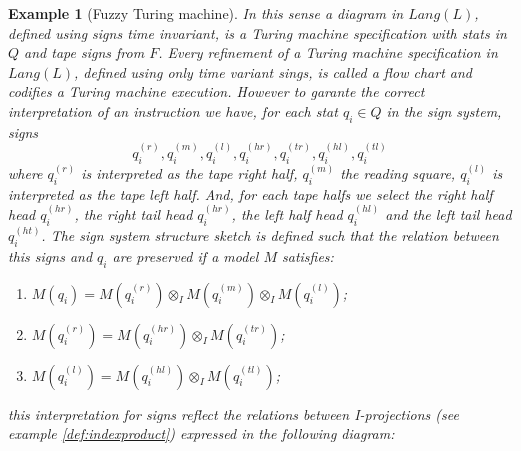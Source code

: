 \documentclass[oribibl]{llncs}
\newtheorem{exam}{Example}
\begin{document}
\begin{exam}[Fuzzy Turing machine]
 In this sense a diagram in $Lang(L)$, defined using signs time invariant, is a \emph{Turing machine specification} with stats in $Q$ and tape signs from $F$.  Every refinement of a Turing machine specification in $Lang(L)$, defined using only time variant sings, is called a \emph{flow chart} and codifies a Turing machine execution. However to garante the correct interpretation of an instruction we have, for each stat $q_i\in Q$ in the sign system,  signs \[q_i^{(r)},q_i^{(m)},q_i^{(l)},q_i^{(hr)},q_i^{(tr)},q_i^{(hl)},q_i^{(tl)}\]
 where $q_i^{(r)}$ is interpreted as the tape right half, $q_i^{(m)}$ the reading square, $q_i^{(l)}$ is interpreted as the tape left half. And, for each tape halfs we select the right half head $q_i^{(hr)}$, the right tail head $q_i^{(hr)}$, the left half head $q_i^{(hl)}$ and the left tail head $q_i^{(ht)}$. The sign system structure sketch is defined such that the relation between this signs and $q_i$ are preserved if a model $M$ satisfies:
 \begin{enumerate}
   \item $M(q_i)=M(q_i^{(r)})\otimes_I M(q_i^{(m)})\otimes_I M(q_i^{(l)})$;
   \item $M(q_i^{(r)})=M(q_i^{(hr)})\otimes_I M(q_i^{(tr)})$;
   \item $M(q_i^{(l)})=M(q_i^{(hl)})\otimes_I M(q_i^{(tl)})$;
 \end{enumerate}
this interpretation for signs reflect the relations between I-projections (see example  \ref{def:indexproduct}) expressed in the following diagram:


\end{exam}
\end{document}
